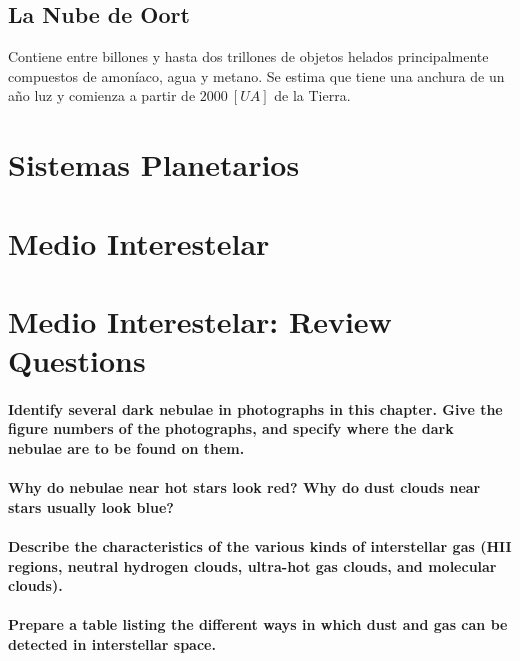 \documentclass{tufte-handout}
\begin{document}
\subsection{La Nube de Oort}

Contiene entre billones y hasta dos trillones de objetos helados principalmente compuestos de amoníaco, agua y metano. Se estima que tiene una anchura de un año luz y comienza a partir de $2000~[UA]$ de la Tierra.

\clearpage

\section{Sistemas Planetarios}

\clearpage

\section{Medio Interestelar}

\section{Medio Interestelar: Review Questions}

\paragraph{Identify several dark nebulae in photographs in this chapter. Give the figure numbers of the photographs,
and specify where the dark nebulae are to be found on them.}

\paragraph{Why do nebulae near hot stars look red? Why do dust clouds near stars usually look blue?}

\paragraph{Describe the characteristics of the various kinds of interstellar gas (HII regions, neutral hydrogen clouds,
ultra-hot gas clouds, and molecular clouds).}

\paragraph{Prepare a table listing the different ways in which dust and gas can be detected in interstellar space.}
\end{document}
